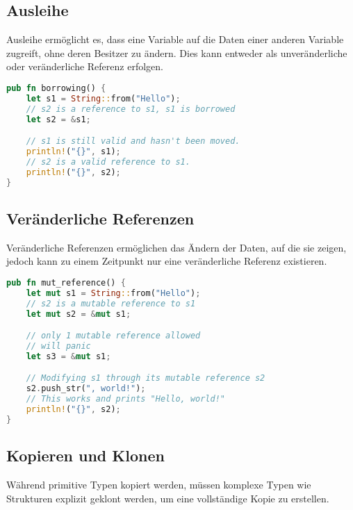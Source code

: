 \subsection{Ausleihe}
Ausleihe ermöglicht es, dass eine Variable auf die Daten einer anderen Variable zugreift, ohne deren Besitzer zu ändern. Dies kann entweder als unveränderliche oder veränderliche Referenz erfolgen.

\begin{lstlisting}[language=Rust, caption=Unveränderliche Ausleihe Beispiel]
pub fn borrowing() {
    let s1 = String::from("Hello");
    // s2 is a reference to s1, s1 is borrowed
    let s2 = &s1;  

    // s1 is still valid and hasn't been moved.
    println!("{}", s1); 
    // s2 is a valid reference to s1.
    println!("{}", s2); 
}
\end{lstlisting}

\subsection{Veränderliche Referenzen}
Veränderliche Referenzen ermöglichen das Ändern der Daten, auf die sie zeigen, jedoch kann zu einem Zeitpunkt nur eine veränderliche Referenz existieren.

\begin{lstlisting}[language=Rust, caption=Veränderliche Referenz Beispiel]
pub fn mut_reference() {
    let mut s1 = String::from("Hello");
    // s2 is a mutable reference to s1
    let mut s2 = &mut s1;  

    // only 1 mutable reference allowed
    // will panic
    let s3 = &mut s1;

    // Modifying s1 through its mutable reference s2
    s2.push_str(", world!"); 
    // This works and prints "Hello, world!"
    println!("{}", s2); 
}
\end{lstlisting}
\cleardoublepage
\subsection{Kopieren und Klonen}
Während primitive Typen kopiert werden, müssen komplexe Typen wie Strukturen explizit geklont werden, um eine vollständige Kopie zu erstellen.

